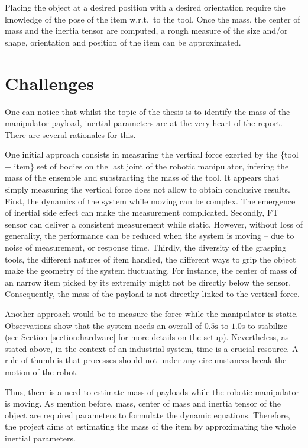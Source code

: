 \documentclass[/home/francois/latex/report/main.tex]{subfiles}
\begin{document}
Placing the object at a desired position with a desired orientation require the knowledge of the pose of the item w.r.t.\ to the tool. Once the mass, the center of mass and the inertia tensor are computed, a rough measure of the size and/or shape, orientation and position of the item can be approximated.

\section{Challenges}

One can notice that whilst the topic of the thesis is to identify the mass of the manipulator payload, inertial parameters are at the very heart of the report. There are several rationales for this.

One initial approach consists in measuring the vertical force exerted by the \{tool + item\} set of bodies on the last joint of the robotic manipulator, infering the mass of the ensemble and substracting the mass of the tool. It appears that simply measuring the vertical force does not allow to obtain conclusive results. First, the dynamics of the system while moving can be complex. The emergence of inertial side effect can make the measurement complicated. Secondly, \ac{FT} sensor can deliver a consistent measurement while static. However, without loss of generality, the performance can be reduced when the system is moving – due to noise of measurement, or response time. Thirdly, the diversity of the grasping tools, the different natures of item handled, the different ways to grip the object make the geometry of the system fluctuating. For instance, the center of mass of an narrow item picked by its extremity might not be directly below the sensor. Consequently, the mass of the payload is not directky linked to the vertical force.

Another approach would be to measure the force while the manipulator is static. Observations show that the system needs an overall of $0.5 \si{\second}$ to $1.0 \si{\second}$ to stabilize (see Section \ref{section:hardware} for more details on the setup). Nevertheless, as stated above, in the context of an industrial system, time is a crucial resource. A rule of thumb is that processes should not under any circumstances break the motion of the robot.

Thus, there is a need to estimate mass of payloads while the robotic manipulator is moving. As mention before, mass, center of mass and inertia tensor of the object are required parameters to formulate the dynamic equations. Therefore, the project aims at estimating the mass of the item by approximating the whole inertial parameters.
\end{document}
